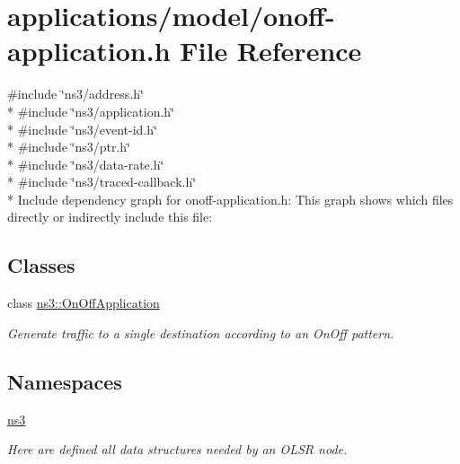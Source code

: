 \hypertarget{onoff-application_8h}{}\section{applications/model/onoff-\/application.h File Reference}
\label{onoff-application_8h}
{\ttfamily \#include \char`\"{}ns3/address.\+h\char`\"{}}\\*
{\ttfamily \#include \char`\"{}ns3/application.\+h\char`\"{}}\\*
{\ttfamily \#include \char`\"{}ns3/event-\/id.\+h\char`\"{}}\\*
{\ttfamily \#include \char`\"{}ns3/ptr.\+h\char`\"{}}\\*
{\ttfamily \#include \char`\"{}ns3/data-\/rate.\+h\char`\"{}}\\*
{\ttfamily \#include \char`\"{}ns3/traced-\/callback.\+h\char`\"{}}\\*
Include dependency graph for onoff-\/application.h\+:
This graph shows which files directly or indirectly include this file\+:
\subsection*{Classes}
\begin{DoxyCompactItemize}
\item 
class \hyperlink{classns3_1_1OnOffApplication}{ns3\+::\+On\+Off\+Application}
\begin{DoxyCompactList}\small\item\em Generate traffic to a single destination according to an On\+Off pattern. \end{DoxyCompactList}\end{DoxyCompactItemize}
\subsection*{Namespaces}
\begin{DoxyCompactItemize}
\item 
 \hyperlink{namespacens3}{ns3}
\begin{DoxyCompactList}\small\item\em Here are defined all data structures needed by an O\+L\+SR node. \end{DoxyCompactList}\end{DoxyCompactItemize}
